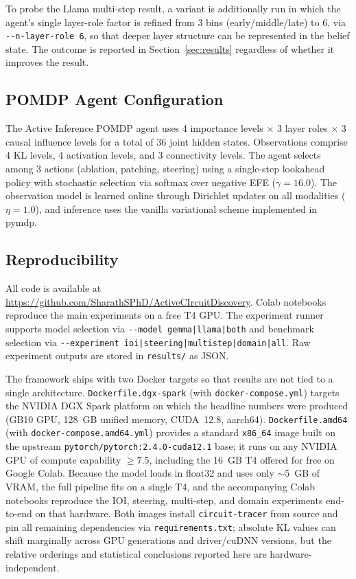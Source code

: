 To probe the Llama multi-step result, a
variant is additionally run in which the agent's single layer-role factor is
refined from 3 bins (early/middle/late) to 6, via \texttt{-{}-n-layer-role 6}, so
that deeper layer structure can be represented in the belief state. The outcome is
reported in Section~\ref{sec:results} regardless of whether it improves the result.

\subsection{POMDP Agent Configuration}

The Active Inference POMDP agent uses 4 importance levels $\times$
3 layer roles $\times$ 3 causal influence levels for a total of 36
joint hidden states.  Observations comprise 4 KL levels, 4 activation
levels, and 3 connectivity levels.  The agent selects among 3 actions
(ablation, patching, steering) using a single-step lookahead policy
with stochastic selection via softmax over negative EFE
($\gamma = 16.0$).  The observation model is learned online through
Dirichlet updates on all modalities ($\eta = 1.0$), and inference
uses the vanilla variational scheme implemented in pymdp.

\subsection{Reproducibility}

All code is available at
\url{https://github.com/SharathSPhD/ActiveCIrcuitDiscovery}.
Colab notebooks reproduce the main experiments on a free T4 GPU.
The experiment runner supports model selection via
\texttt{-{}-model gemma|llama|both} and benchmark selection via
\texttt{-{}-experiment ioi|steering|multistep|domain|all}.
Raw experiment outputs are stored in \texttt{results/} as JSON.

The \ACD{} framework ships with two Docker targets so that results are not
tied to a single architecture.  \texttt{Dockerfile.dgx-spark} (with
\texttt{docker-compose.yml}) targets the NVIDIA DGX Spark platform on which
the headline numbers were produced (GB10 GPU, 128~GB unified memory,
CUDA~12.8, aarch64).  \texttt{Dockerfile.amd64} (with
\texttt{docker-compose.amd64.yml}) provides a standard \texttt{x86\_64}
image built on the upstream \texttt{pytorch/pytorch:2.4.0-cuda12.1} base; it
runs on any NVIDIA GPU of compute capability $\geq 7.5$, including the
16~GB T4 offered for free on Google Colab.  Because the model loads in
float32 and uses only $\sim$5~GB of VRAM, the full pipeline fits on a single
T4, and the accompanying Colab notebooks reproduce the IOI, steering,
multi-step, and domain experiments end-to-end on that hardware.  Both images
install \texttt{circuit-tracer} from source and pin all remaining
dependencies via \texttt{requirements.txt}; absolute KL values can shift
marginally across GPU generations and driver/cuDNN versions, but the
relative orderings and statistical conclusions reported here are
hardware-independent.

